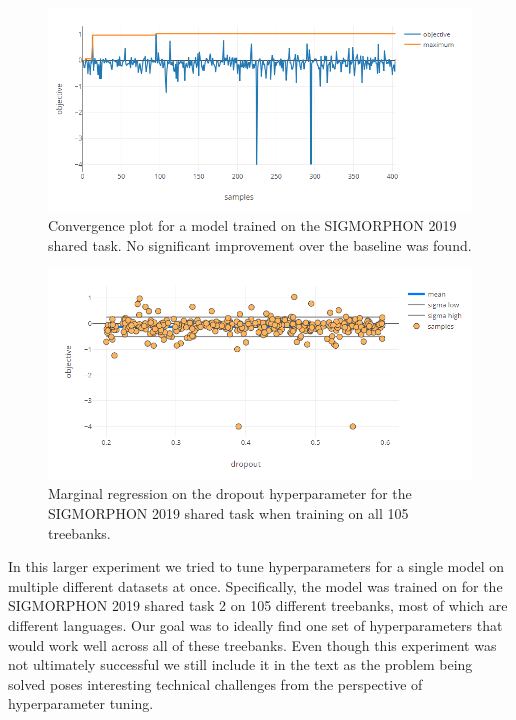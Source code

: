 \begin{figure}
	\begin{center}
		\includegraphics[width=1.0\textwidth]{images/sigmorphon-convergence.png}
		\caption{Convergence plot for a model trained on the SIGMORPHON 2019 shared task. No significant improvement over the baseline was found.}
		\label{figure:sigmorphon-convergence}
	\end{center}
\end{figure}

\begin{figure}
	\begin{center}
		\includegraphics[width=1.0\textwidth]{images/sigmorphon-dropout.png}
		\caption{Marginal regression on the dropout hyperparameter for the SIGMORPHON 2019 shared task when training on all 105 treebanks.}
		\label{figure:sigmorphon-dropout}
	\end{center}
\end{figure}

In this larger experiment we tried to tune hyperparameters for a single model on multiple different datasets at once. Specifically, the model was trained on for the SIGMORPHON 2019 shared task 2 \citep{sigmorphon2019task2} on 105 different treebanks, most of which are different languages. Our goal was to ideally find one set of hyperparameters that would work well across all of these treebanks. Even though this experiment was not ultimately successful we still include it in the text as the problem being solved poses interesting technical challenges from the perspective of hyperparameter tuning.

